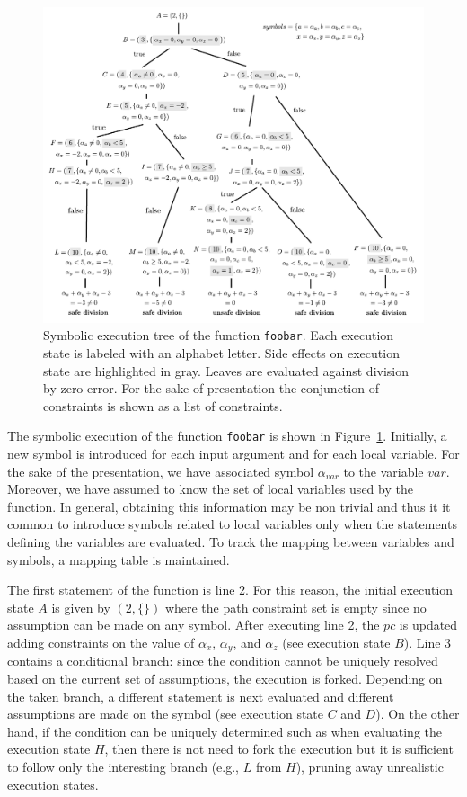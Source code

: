 \documentclass[10pt, a4paper]{article}
\begin{document}
\begin{figure}[t]
  \centering
  \includegraphics[width=1.0\columnwidth]{images/example} 
  \caption{Symbolic execution tree of the function {\tt foobar}. Each execution state is labeled with an alphabet letter. Side effects on execution state are highlighted in gray. Leaves are evaluated against division by zero error. For the sake of presentation the conjunction of constraints is shown as a list of constraints. }
  \label{fig:example-symbolic-execution}
\end{figure}

The symbolic execution of the function {\tt foobar} is shown in Figure~\ref{fig:example-symbolic-execution}. Initially, a new symbol is introduced for each input argument and for each local variable. For the sake of the presentation, we have associated symbol $\alpha_{var}$ to the variable $var$. Moreover, we have assumed to know the set of local variables used by the function. In general, obtaining this information may be non trivial and thus it it common to introduce symbols related to local variables only when the statements defining the variables are evaluated. To track the mapping between variables and symbols, a mapping table is maintained. 

The first statement of the function is line 2. For this reason, the initial execution state $A$ is given by $(2, \{\})$ where the path constraint set is empty since no assumption can be made on any symbol. After executing line 2, the $pc$ is updated adding constraints on the value of $\alpha_x$, $\alpha_y$, and $\alpha_z$ (see execution state $B$). Line 3 contains a conditional branch: since the condition cannot be uniquely resolved based on the current set of assumptions, the execution is forked. Depending on the taken branch, a different statement is next evaluated and different assumptions are made on the symbol (see execution state $C$ and $D$). On the other hand, if the condition can be uniquely determined such as when evaluating the execution state $H$, then there is not need to fork the execution but it is sufficient to follow only the interesting branch (e.g., $L$ from $H$), pruning away unrealistic execution states. 
\end{document}
